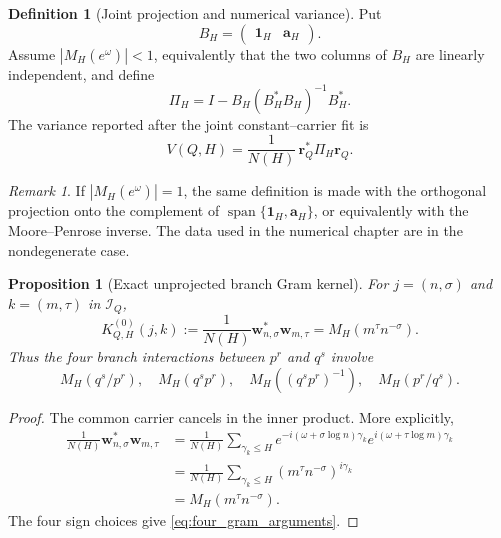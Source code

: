 \documentclass[11pt]{amsart}
\numberwithin{equation}{section}
\theoremstyle{plain}
\newtheorem{proposition}[theorem]{Proposition}
\theoremstyle{definition}
\newtheorem{definition}[theorem]{Definition}
\theoremstyle{remark}
\newtheorem{remark}[theorem]{Remark}
\newcommand{\1}{\mathbf{1}}
\begin{document}
\begin{definition}[Joint projection and numerical variance]
\label{def:joint_projection_variance}
Put
\begin{equation}
B_H=
\begin{pmatrix}
\mathbf 1_H&\mathbf a_H
\end{pmatrix}.
\label{eq:BH_definition}
\end{equation}
Assume $|M_H(e^\omega)|<1$, equivalently that the two columns of $B_H$
are linearly independent, and define
\begin{equation}
\Pi_H
=
I-B_H(B_H^\ast B_H)^{-1}B_H^\ast.
\label{eq:PiH_exact_definition}
\end{equation}
The variance reported after the joint constant--carrier fit is
\begin{equation}
\boxed{
V(Q,H)
=
\frac1{N(H)}\,\mathbf r_Q^\ast\Pi_H\mathbf r_Q.
}
\label{eq:numerical_variance_exact_definition}
\end{equation}
\end{definition}

\begin{remark}
\label{rem:degenerate_joint_projection}
If $|M_H(e^\omega)|=1$, the same definition is made with the orthogonal
projection onto the complement of
$\operatorname{span}\{\mathbf 1_H,\mathbf a_H\}$, or equivalently with
the Moore--Penrose inverse.  The data used in the numerical chapter are in
the nondegenerate case.
\end{remark}

\begin{proposition}[Exact unprojected branch Gram kernel]
\label{prop:unprojected_gram}
For $j=(n,\sigma)$ and $k=(m,\tau)$ in $\mathcal I_Q$,
\begin{equation}
K^{(0)}_{Q,H}(j,k)
:=
\frac1{N(H)}\mathbf w_{n,\sigma}^\ast\mathbf w_{m,\tau}
=
M_H(m^\tau n^{-\sigma}).
\label{eq:unprojected_gram}
\end{equation}
Thus the four branch interactions between $p^r$ and $q^s$ involve
\begin{equation}
M_H(q^s/p^r),
\quad
M_H(q^sp^r),
\quad
M_H((q^sp^r)^{-1}),
\quad
M_H(p^r/q^s).
\label{eq:four_gram_arguments}
\end{equation}
\end{proposition}

\begin{proof}
The common carrier cancels in the inner product.  More explicitly,
\begin{align}
\frac1{N(H)}\mathbf w_{n,\sigma}^\ast\mathbf w_{m,\tau}
&=
\frac1{N(H)}
\sum_{\gamma_k\leq H}
 e^{-i(\omega+\sigma\log n)\gamma_k}
 e^{ i(\omega+\tau\log m)\gamma_k}
\label{eq:branch_gram_expansion}
\\
&=
\frac1{N(H)}
\sum_{\gamma_k\leq H}
(m^\tau n^{-\sigma})^{i\gamma_k}
\label{eq:branch_gram_kernel_step}
\\
&=
M_H(m^\tau n^{-\sigma}).
\label{eq:branch_gram_kernel_result}
\end{align}
The four sign choices give \eqref{eq:four_gram_arguments}.
\end{proof}
\end{document}
